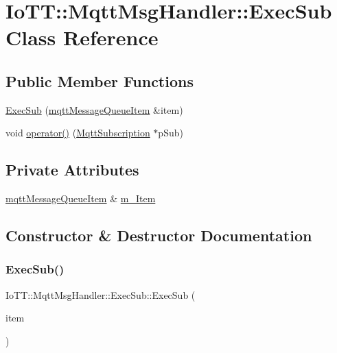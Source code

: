 \hypertarget{classIoTT_1_1MqttMsgHandler_1_1ExecSub}{}\section{Io\+TT\+:\+:Mqtt\+Msg\+Handler\+:\+:Exec\+Sub Class Reference}
\label{classIoTT_1_1MqttMsgHandler_1_1ExecSub}
\subsection*{Public Member Functions}
\begin{DoxyCompactItemize}
\item 
\hyperlink{classIoTT_1_1MqttMsgHandler_1_1ExecSub_aa4ae518766a14ff6a82c1977ae443abd}{Exec\+Sub} (\hyperlink{classIoTT_1_1mqttMessageQueueItem}{mqtt\+Message\+Queue\+Item} \&item)
\item 
void \hyperlink{classIoTT_1_1MqttMsgHandler_1_1ExecSub_a2fd3aebce216568e4117c0841ef68718}{operator()} (\hyperlink{classIoTT_1_1MqttSubscription}{Mqtt\+Subscription} $\ast$p\+Sub)
\end{DoxyCompactItemize}
\subsection*{Private Attributes}
\begin{DoxyCompactItemize}
\item 
\hyperlink{classIoTT_1_1mqttMessageQueueItem}{mqtt\+Message\+Queue\+Item} \& \hyperlink{classIoTT_1_1MqttMsgHandler_1_1ExecSub_aedecbc827f2898f0bbb8d2a1ba37b6d1}{m\+\_\+\+Item}
\end{DoxyCompactItemize}


\subsection{Constructor \& Destructor Documentation}
\mbox{\label{classIoTT_1_1MqttMsgHandler_1_1ExecSub_aa4ae518766a14ff6a82c1977ae443abd}} 
\subsubsection{\texorpdfstring{Exec\+Sub()}{ExecSub()}}
{\footnotesize\ttfamily Io\+T\+T\+::\+Mqtt\+Msg\+Handler\+::\+Exec\+Sub\+::\+Exec\+Sub (\begin{DoxyParamCaption}\item[{\hyperlink{classIoTT_1_1mqttMessageQueueItem}{mqtt\+Message\+Queue\+Item} \&}]{item }\end{DoxyParamCaption})}


